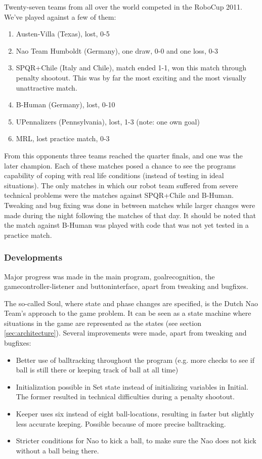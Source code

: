 \documentclass[11pt,a4paper,oneside]{article}
\begin{document}
Twenty-seven teams from all over the world competed in the RoboCup 2011. We've played against a few of them:
\begin{enumerate}
\item Austen-Villa (Texas), lost, 0-5
\item Nao Team Humboldt (Germany), one draw, 0-0 and one loss, 0-3
\item SPQR+Chile (Italy and Chile), match ended 1-1, won this match through penalty shootout. This was by far the most exciting and the most visually unattractive match.
\item B-Human (Germany), lost, 0-10
\item UPennalizers (Pennsylvania), lost, 1-3 (note: one own goal)
\item MRL, lost practice match, 0-3
\end{enumerate}
From this opponents three teams reached the quarter finals, and one was the later champion.
Each of these matches posed a chance to see the programs capability of coping with real life conditions (instead of testing in ideal situations). The only matches in which our robot team suffered from severe technical problems were the matches against SPQR+Chile and B-Human. Tweaking and bug fixing was done in between matches while larger changes were made during the night following the matches of that day. It should be noted that the match against B-Human was played with code that was not yet tested in a practice match.

\subsubsection{Developments}
Major progress was made in the main program, goalrecognition, the gamecontroller-listener and buttoninterface, apart from tweaking and bugfixes.

The so-called Soul, where state and phase changes are specified, is the Dutch Nao Team's approach to the game problem. It can be seen as a state machine where situations in the game are represented as the states (see section \ref{sec:architecture}). Several improvements were made, apart from tweaking and bugfixes:
\begin{itemize}
\item Better use of balltracking throughout the program (e.g. more checks to see if ball is still there or keeping track of ball at all time)
\item Initialization possible in Set state instead of initializing variables in Initial. The former resulted in technical difficulties during a penalty shootout.
\item Keeper uses six instead of eight ball-locations, resulting in faster but slightly less accurate keeping. Possible because of more precise balltracking.
\item Stricter conditions for Nao to kick a ball, to make sure the Nao does not kick without a ball being there. 
\end{itemize}
\end{document}
